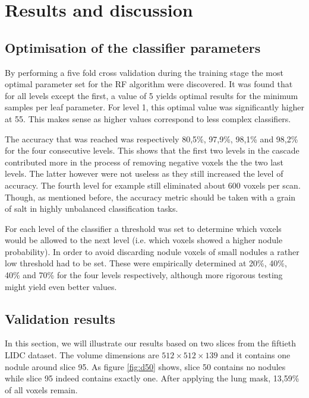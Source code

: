 \section{Results and discussion}
\subsection{Optimisation of the classifier parameters}
By performing a five fold cross validation during the training stage the most
optimal parameter set for the RF algorithm were discovered. It was found that
for all levels except the first, a value of 5 yields optimal results for the
minimum samples per leaf parameter. For level 1, this optimal value was
significantly higher at 55. This makes sense as higher values correspond to less
complex classifiers.

The accuracy that was reached was respectively 80,5\%, 97,9\%, 98,1\% and 98,2\%
for the four consecutive levels. This shows that the first two levels in the
cascade contributed more in the process of removing negative voxels the the two
last levels. The latter however were not useless as they still increased the
level of accuracy. The fourth level for example still eliminated about 600
voxels per scan. Though, as mentioned before, the accuracy metric should be taken
with a grain of salt in highly unbalanced classification tasks.

For each level of the classifier a threshold was set to determine which voxels
would be allowed to the next level (i.e. which voxels showed a higher nodule
probability). In order to avoid discarding nodule voxels of small nodules a
rather low threshold had to be set. These were empirically determined at 20\%,
40\%, 40\% and 70\% for the four levels respectively, although more rigorous
testing might yield even better values.

\subsection{Validation results}
In this section, we will illustrate our results based on two slices from the
fiftieth LIDC dataset. The volume dimensions are $512 \times 512\times 139$ and
it contains one nodule around slice 95. As figure \ref{fig:d50} shows, slice 50
contains no nodules while slice 95 indeed contains exactly one. After applying
the lung mask, 13,59\% of all voxels remain.

